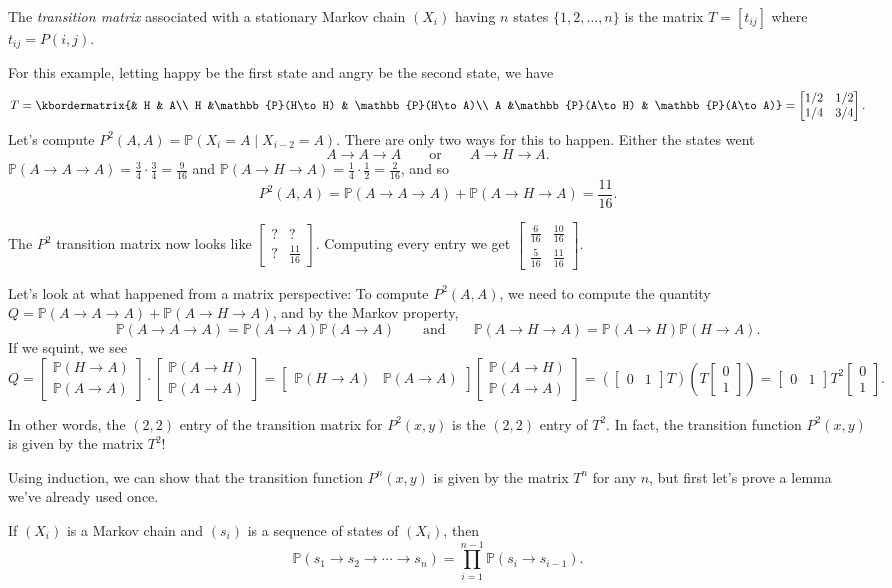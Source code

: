\documentclass{problemset}
\newcommand{\mat}[1]{\begin{bmatrix}#1\end{bmatrix}}
\renewcommand{\P}{\mathbb{P}}
\begin{document}
	\begin{definition}
		The \emph{transition matrix} associated with a stationary Markov chain $(X_i)$ having
		$n$ states $\{1,2,\ldots, n\}$ is the matrix $T=[t_{ij}]$ where $t_{ij}=P(i,j)$.
	\end{definition}

	For this example, letting happy be the first state and angry be the second state, we have
	\[
		T=\kbordermatrix{& H & A\\ H &\P(H\to H) & \P(H\to A)\\ A &\P(A\to H) & \P(A\to A)}=\mat{1/2&1/2\\1/4&3/4}.
	\]
	Let's compute $P^2(A,A)=\P(X_i=A\mid X_{i-2}=A)$.  There are only two ways for this to happen.  Either
	the states went 
	\[
		A\to A\to A\qquad\text{or}\qquad A\to H\to A.
	\]
	$\P(A\to A\to A) = \frac{3}{4}\cdot \frac{3}{4} = \frac{9}{16}$ and $\P(A\to H\to A) = \frac{1}{4}\cdot \frac{1}{2}=\frac{2}{16}$,
	and so
	\[
		P^2(A,A) = \P(A\to A\to A)+\P(A\to H\to A) = \frac{11}{16}.
	\]

	The $P^2$ transition matrix now looks like $\mat{?&?\\?&\frac{11}{16}}$.  Computing every
	entry we get $\mat{\frac{6}{16}&\frac{10}{16}\\\frac{5}{16}&\frac{11}{16}}$.


	Let's look at what happened from a matrix perspective:  To compute $P^2(A,A)$, we
	need to compute the quantity $Q=\P(A\to A\to A)+\P(A\to H\to A)$, and by the 
	Markov property,
	\[
		\P(A\to A\to A) =  \P(A\to A)\P( A\to A)
		\qquad\text{and}\qquad
		\P(A\to H\to A) =  \P(A\to H)\P( H\to A).
	\]
	If we squint, we see
	\[
		Q=\mat{\P( H\to A)\\ \P(A\to A)}\cdot \mat{\P(A\to H)\\\P(A\to A)}
		=\mat{\P( H\to A) & \P(A\to A)} \mat{\P(A\to H)\\\P(A\to A)}
		=(\mat{0&1}T)\left(T\mat{0\\1}\right) = \mat{0&1}T^2\mat{0\\1}.
	\]

	In other words, the $(2,2)$ entry of the transition matrix for $P^2(x,y)$ is the
	$(2,2)$ entry of $T^2$.  In fact, the transition function $P^2(x,y)$ is given by the
	matrix $T^2$!

	Using induction, we can show that the transition function $P^n(x,y)$ is given by
	the matrix $T^n$ for any $n$, but first let's prove a lemma we've already used once.

	\begin{lemma}
		If $(X_i)$ is a Markov chain and $(s_i)$ is a sequence of states of $(X_i)$, then
		\[
			\P(s_1\to s_2\to\cdots \to s_n) = \prod_{i=1}^{n-1} \P(s_i\to s_{i-1}).
		\]
	\end{lemma}
	
\end{document}
